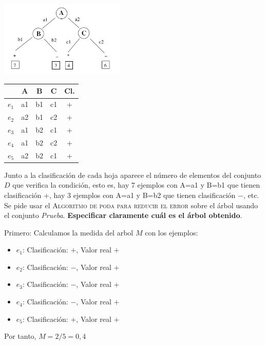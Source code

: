 \documentclass{article}
\begin{document}
{\centering
\begin{minipage}{0.45\textwidth}
   \centering
\includegraphics[width=60mm]{arbol_1.png}
\end{minipage}
\begin{minipage}{0.45\textwidth}
   \centering
\begin{tabular}{|c|c|c|c|c|}
\hline
\textit{} & \textbf{A} & B  & C  & Cl. \\ \hline
$e_1$      & a1         & b1 & c1 & +   \\ \hline
$e_2$      & a2         & b1 & c2 & +   \\ \hline
$e_3$      & a1         & b2 & c1 & +   \\ \hline
$e_4$      & a1         & b2 & c2 & +   \\ \hline
$e_5$      & a2         & b2 & c1 & +   \\ \hline
\end{tabular}
\end{minipage}
}
\begin{flushleft}
Junto a la clasificación de cada hoja aparece el número de elementos del conjunto $D$ que verifica la condición, esto es, hay 7 ejemplos con A=a1 y B=b1 que tienen clasificación $+$, hay 3 ejemplos con A=a1 y B=b2 que tienen clasificación $-$, etc. Se pide usar el \textsc{Algoritmo de poda para reducir el error} sobre el árbol usando el conjunto \emph{Prueba}. \textbf{Especificar claramente cuál es el árbol obtenido}.
\end{flushleft}
Primero: Calculamos la medida del arbol $M$ con los ejemplos:
\begin{itemize}
    \item $e_1$: Clasificación: $+$, Valor real $+$
    \item $e_2$: Clasificación: $-$, Valor real $+$
    \item $e_3$: Clasificación: $-$, Valor real $+$
    \item $e_4$: Clasificación: $-$, Valor real $+$
    \item $e_5$: Clasificación: $+$, Valor real $+$
\end{itemize}
Por tanto, $M = 2/5 = 0,4$\\\\
\end{document}
